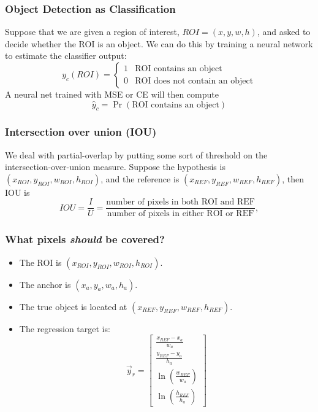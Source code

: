 \documentclass{beamer}
\begin{document}
\begin{frame}
  \frametitle{Object Detection as Classification}
  
  Suppose that we are given a region of interest, $ROI=(x,y,w,h)$, and
  asked to decide whether the ROI is an object.  We can do this by
  training a neural network to estimate the classifier output:
  \[
  y_c(ROI) = \begin{cases}
    1 & \mbox{ROI contains an object}\\
    0 & \mbox{ROI does not contain  an object}
  \end{cases}
  \]
  A neural net trained with MSE or CE will then compute
  \[
  \hat{y}_c=\Pr\left(\mbox{ROI contains an object}\right)
  \]
\end{frame}

\begin{frame}
  \frametitle{Intersection  over union (IOU)}
  
  We deal with partial-overlap by putting some sort of threshold on
  the intersection-over-union measure.  Suppose the hypothesis is
  $(x_{ROI},y_{ROI},w_{ROI},h_{ROI})$, and the reference is
  $(x_{REF},y_{REF},w_{REF},h_{REF})$, then IOU is
  \begin{displaymath}
    IOU =\frac{I}{U}=
    \frac{\mbox{number of pixels in both ROI and REF}}{\mbox{number of pixels in either ROI or REF}},
  \end{displaymath}
\end{frame}

\begin{frame}
  \frametitle{What pixels {\bf\em should} be covered?}

  \begin{itemize}
  \item The ROI is $(x_{ROI},y_{ROI},w_{ROI},h_{ROI})$.
  \item The anchor is $(x_{a},y_{a},w_{a},h_{a})$.
  \item The true object is located at $(x_{REF},y_{REF},w_{REF},h_{REF})$.
  \item The regression  target is:
    \[
    \vec{y}_r = \left[\begin{array}{c}
        \frac{x_{REF}-x_{a}}{w_{a}}\\
        \frac{y_{REF}-y_{a}}{h_{a}}\\
        \ln\left(\frac{w_{REF}}{w_{a}}\right)\\
        \ln\left(\frac{h_{REF}}{h_{a}}\right)
      \end{array}\right]
    \]
  \end{itemize}
\end{frame}
\end{document}
